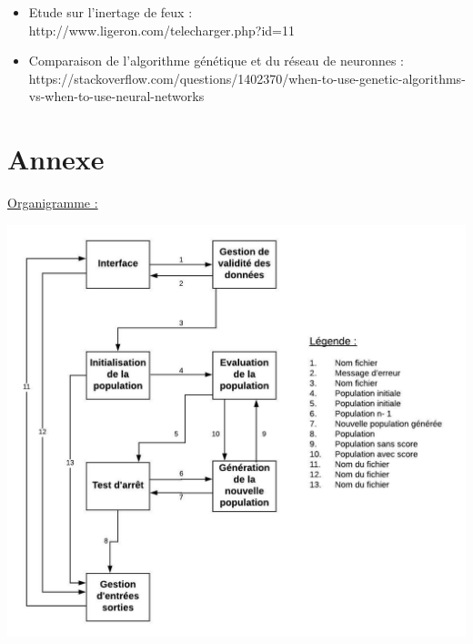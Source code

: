 \documentclass[a4paper,11pt]{article}
\begin{document}
\begin{itemize}
		\item Etude sur l'inertage de feux :\\
		http://www.ligeron.com/telecharger.php?id=11\\

		\item Comparaison de l'algorithme génétique et du réseau de neuronnes :\\
		https://stackoverflow.com/questions/1402370/when-to-use-genetic-algorithms-vs-when-to-use-neural-networks\\
	\end{itemize}
	
	\newpage
	\section{Annexe}
		\underline{Organigramme :}\\
		\centerline{\includegraphics{OrganigrammeV5.jpeg}}
\end{document}
